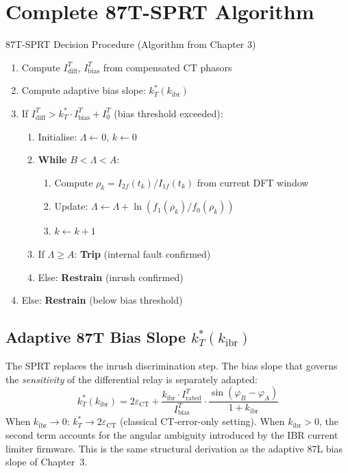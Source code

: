 \documentclass[12pt,a4paper]{article}
\newcommand{\kibr}{k_\mathrm{ibr}}
\newcommand{\Idiff}{I_\mathrm{diff}}
\newcommand{\Ibias}{I_\mathrm{bias}}
\begin{document}
\section{Complete 87T-SPRT Algorithm}

\begin{archbox}{87T-SPRT Decision Procedure (Algorithm from Chapter 3)}
\begin{enumerate}[nosep]
  \item Compute $\Idiff^T$, $\Ibias^T$ from compensated CT phasors
  \item Compute adaptive bias slope: $k_T^*(\kibr)$
  \item If $\Idiff^T > k_T^* \cdot \Ibias^T + I_0^T$ (bias threshold exceeded):
    \begin{enumerate}[nosep]
      \item Initialise: $\Lambda \gets 0$, $k \gets 0$
      \item \textbf{While} $B < \Lambda < A$:
        \begin{enumerate}[nosep]
          \item Compute $\rho_k = I_{2f}(t_k)/I_{1f}(t_k)$ from current DFT window
          \item Update: $\Lambda \gets \Lambda + \ln(f_1(\rho_k)/f_0(\rho_k))$
          \item $k \gets k+1$
        \end{enumerate}
      \item If $\Lambda \geq A$: \textbf{Trip} (internal fault confirmed)
      \item Else: \textbf{Restrain} (inrush confirmed)
    \end{enumerate}
  \item Else: \textbf{Restrain} (below bias threshold)
\end{enumerate}
\end{archbox}

\subsection{Adaptive 87T Bias Slope $k_T^*(\kibr)$}

The SPRT replaces the inrush discrimination step. The bias slope that governs the \textit{sensitivity} of the differential relay is separately adapted:
\[
  k_T^*(\kibr) = 2\varepsilon_\mathrm{CT} +
    \frac{\kibr \cdot I_\mathrm{rated}^T}{I_\mathrm{bias}^T}
    \cdot \frac{\sin(\varphi_B - \varphi_A)}{1 + \kibr}
\]
When $\kibr \to 0$: $k_T^* \to 2\varepsilon_\mathrm{CT}$ (classical CT-error-only setting). When $\kibr > 0$, the second term accounts for the angular ambiguity introduced by the IBR current limiter firmware. This is the same structural derivation as the adaptive 87L bias slope of Chapter~3.
\end{document}
